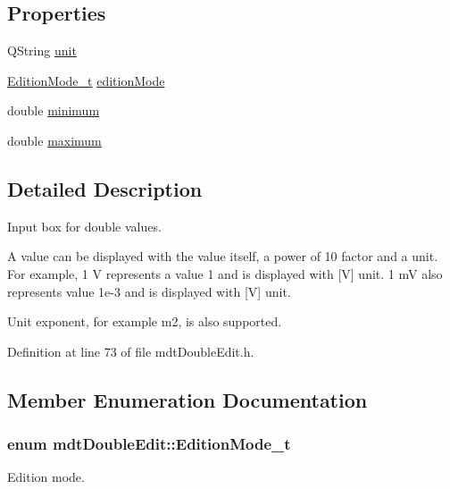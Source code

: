 \subsection*{Properties}
\begin{DoxyCompactItemize}
\item 
Q\-String \hyperlink{classmdt_double_edit_a163c58477dc88637f999f56714df74ee}{unit}
\item 
\hyperlink{classmdt_double_edit_a52cc3f5b9d6acd6838c52d478b3ea4dd}{Edition\-Mode\-\_\-t} \hyperlink{classmdt_double_edit_a07e017947a40b9f0eb423c1122ba9646}{edition\-Mode}
\item 
double \hyperlink{classmdt_double_edit_adc63b2b7f47fac62e44673d51444776e}{minimum}
\item 
double \hyperlink{classmdt_double_edit_a80edcc2b96d1111f608037f058596c02}{maximum}
\end{DoxyCompactItemize}


\subsection{Detailed Description}
Input box for double values. 

A value can be displayed with the value itself, a power of 10 factor and a unit. For example, 1 V represents a value 1 and is displayed with \mbox{[}V\mbox{]} unit. 1 m\-V also represents value 1e-\/3 and is displayed with \mbox{[}V\mbox{]} unit.

Unit exponent, for example m2, is also supported. 

Definition at line 73 of file mdt\-Double\-Edit.\-h.



\subsection{Member Enumeration Documentation}
\hypertarget{classmdt_double_edit_a52cc3f5b9d6acd6838c52d478b3ea4dd}{
\subsubsection[{Edition\-Mode\-\_\-t}]{\setlength{\rightskip}{0pt plus 5cm}enum {\bf mdt\-Double\-Edit\-::\-Edition\-Mode\-\_\-t}}}\label{classmdt_double_edit_a52cc3f5b9d6acd6838c52d478b3ea4dd}


Edition mode. 

